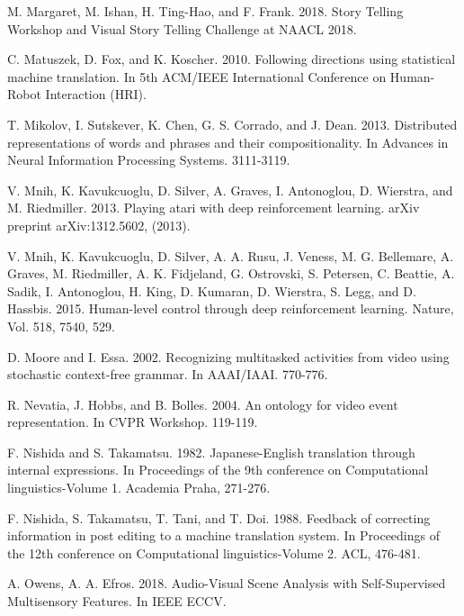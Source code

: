 \documentclass[10pt,journal,compsoc]{IEEEtran}
\begin{document}
\begin{thebibliography}{1}
M. Margaret, M. Ishan, H. Ting-Hao, and F. Frank. 2018. Story Telling Workshop and Visual Story Telling Challenge at NAACL 2018.

C. Matuszek, D. Fox, and K. Koscher. 2010. Following directions using statistical machine translation. In 5th ACM/IEEE International Conference on Human-Robot Interaction (HRI).

T. Mikolov, I. Sutskever, K. Chen, G. S. Corrado, and J. Dean. 2013. Distributed representations of words and phrases and their compositionality. In Advances in Neural Information Processing Systems. 3111-3119.

V. Mnih, K. Kavukcuoglu, D. Silver, A. Graves, I. Antonoglou, D. Wierstra, and M. Riedmiller. 2013. Playing atari with deep reinforcement learning. arXiv preprint arXiv:1312.5602, (2013).

V. Mnih, K. Kavukcuoglu, D. Silver, A. A. Rusu, J. Veness, M. G. Bellemare, A. Graves, M. Riedmiller, A. K. Fidjeland, G. Ostrovski, S. Petersen, C. Beattie, A. Sadik, I. Antonoglou, H. King, D. Kumaran, D. Wierstra, S. Legg, and D. Hassbis. 2015. Human-level control through deep reinforcement learning. Nature, Vol. 518, 7540, 529.

D. Moore and I. Essa. 2002. Recognizing multitasked activities from video using stochastic context-free grammar. In AAAI/IAAI. 770-776.


R. Nevatia, J. Hobbs, and B. Bolles. 2004. An ontology for video event representation. In CVPR Workshop. 119-119.

F. Nishida and S. Takamatsu. 1982. Japanese-English translation through internal expressions. In Proceedings of the 9th conference on Computational linguistics-Volume 1. Academia Praha, 271-276.

F. Nishida, S. Takamatsu, T. Tani, and T. Doi. 1988. Feedback of correcting information in post editing to a machine translation system. In Proceedings of the 12th conference on Computational linguistics-Volume 2. ACL, 476-481.

A. Owens, A. A. Efros. 2018. Audio-Visual Scene Analysis with Self-Supervised Multisensory Features. In IEEE ECCV.


\end{thebibliography}
\end{document}

